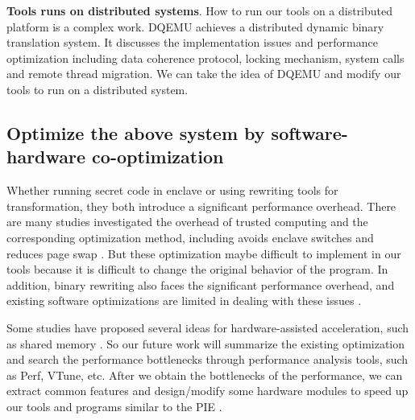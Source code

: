 \textbf{Tools runs on distributed systems}.
How to run our tools on a distributed platform is a complex work.
DQEMU \cite{Zhao2020DQEMUAS} achieves a distributed dynamic binary translation system.
It discusses the implementation issues and performance optimization including
data coherence protocol, locking mechanism, system calls and remote thread migration.
We can take the idea of DQEMU and modify our tools to run on a distributed system.

\subsection{Optimize the above system by software-hardware co-optimization}
Whether running secret code in enclave or using rewriting tools for transformation,
they both introduce a significant performance overhead.
There are many studies investigated the overhead of trusted computing and 
the corresponding optimization method, including avoids enclave switches \cite{Tian2018SwitchlessCM}
and reduces page swap \cite{Orenbach2017EleosEO, Taassori2018VAULTRP}. But these optimization
maybe difficult to implement in our tools because it is difficult to change the
original behavior of the program. 
In addition, binary rewriting also faces the significant performance overhead, and existing
software optimizations are limited in dealing with these issues \cite{Kim2003HardwareSF}.

Some studies have proposed several ideas for hardware-assisted acceleration, such as
shared memory \cite{Jiang2022CRONUSFS}.
So our future work will summarize the existing optimization and search the performance
bottlenecks through performance analysis tools, such as Perf, VTune, etc.
After we obtain the bottlenecks of the performance, we can extract common features
and design/modify some hardware modules to speed up our tools and programs similar to
the PIE \cite{Schneider2021PIEAP}.